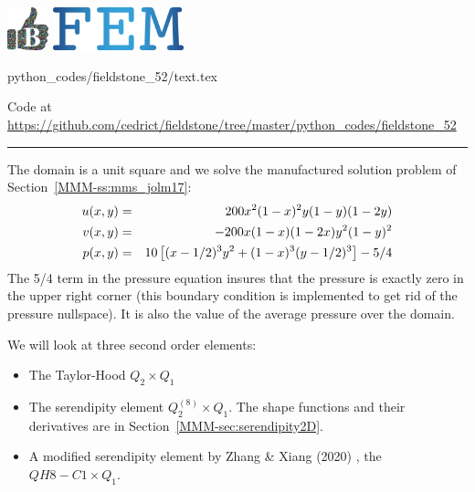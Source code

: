 \includegraphics[height=1.25cm]{images/pictograms/benchmark}
\includegraphics[height=1.25cm]{images/pictograms/FEM}


\begin{flushright} {\tiny {\color{gray} python\_codes/fieldstone\_52/text.tex}} \end{flushright}



\begin{center}
Code at \url{https://github.com/cedrict/fieldstone/tree/master/python_codes/fieldstone_52}
\end{center}

\par\noindent\rule{\textwidth}{0.4pt}



The domain is a unit square and we solve the manufactured solution problem of 
Section~\ref{MMM-ss:mms_jolm17}:
\begin{eqnarray}
u(x,y) &=& 200x^2(1-x)^2y(1-y)(1-2y) \nonumber\\
v(x,y) &=& -200x(1-x)(1-2x)y^2(1-y)^2 \nonumber\\
p(x,y) &=& 10\left[(x-1/2)^3y^2+(1-x)^3(y-1/2)^3 \right] -5/4 \nonumber
\end{eqnarray}
The 5/4 term in the pressure equation insures that the pressure is exactly zero in the 
upper right corner (this boundary condition is implemented to get rid of 
the pressure nullspace). It is also the value of the average pressure over the domain.

We will look at three second order elements:
\begin{itemize}
\item The Taylor-Hood $Q_2\times Q_1$ 
\item The serendipity element $Q_2^{(8)}\times Q_1$. The shape functions 
and their derivatives are in Section~\ref{MMM-sec:serendipity2D}.
\item A modified serendipity element by 
Zhang \& Xiang (2020) \cite{zhxi20}, the $QH8-C1 \times Q_1$.
\end{itemize}

